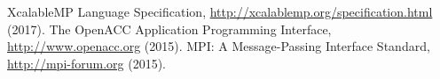 \documentclass[a4paper,11pt,twoside]{report}
\def\XMP{XcalableMP}
\begin{document}

\begin{thebibliography}{99}
  XcalableMP Language Specification, \url{http://xcalablemp.org/specification.html} (2017).
  The OpenACC Application Programming Interface, \url{http://www.openacc.org} (2015).
  MPI: A Message-Passing Interface Standard, \url{http://mpi-forum.org} (2015).
\end{thebibliography}
\end{document}
